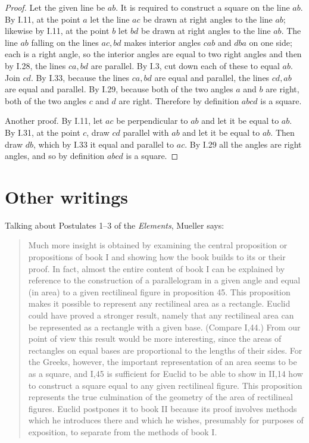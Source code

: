 \documentclass{article}
\begin{document}
\begin{proof}
Let the given line be $ab$.
It is required to construct a square on the line $ab$.
By I.11, at the point $a$ let the line $ac$ be drawn at right angles to the line $ab$; likewise
by I.11, at the point $b$ let $bd$ be drawn at right angles to the line $ab$.
The line $ab$ falling on the lines $ac, bd$ makes interior angles $cab$ and $dba$ on one side; each is a right angle, so the interior angles
are equal to two right angles and then by I.28, the lines $ca,bd$ are parallel.
By I.3, cut down each of these to equal $ab$. 
Join $cd$. By I.33, because the lines $ca,bd$ are equal and parallel, the lines $cd,ab$ are equal and parallel.
By I.29, because both of the two angles $a$ and $b$ are right, both of the two angles $c$ and $d$ are right. Therefore by definition $abcd$
is a square.  

Another proof. By I.11, let $ac$ be perpendicular to $ab$ and let it be equal to $ab$. By I.31, at the point $c$, draw $cd$ parallel
with $ab$ and let it be equal to $ab$. Then draw $db$, which by I.33 it equal and parallel to $ac$.
By I.29 all the angles are right angles, and so by definition $abcd$ is a square.
\end{proof}




\section{Other writings}
Talking about Postulates 1--3 of the {\em Elements}, Mueller \cite[p.~16]{mueller} says:

\begin{quote}
Much more insight is obtained by examining the central proposition or propositions of book I and showing how the
book builds to its or their proof. In fact, almost the entire content of book I can be explained by reference to the construction of a 
parallelogram in a given angle and equal (in area) to a given rectilineal figure in proposition 45. This proposition makes it possible to represent
any rectilineal area as a rectangle. Euclid could have proved a stronger result, namely that any rectilineal area can be represented as a rectangle with a given base.
(Compare I,44.) From our point of view this result would be more interesting, since the areas of rectangles on equal bases are proportional
to the lengths of their sides. For the Greeks, however, the important representation of an area seems to be as a square, and I,45 is sufficient
for Euclid to be able to show in II,14 how to construct a square equal to any given rectilineal figure. This proposition represents
the true culmination of the geometry of the area of rectilineal figures. Euclid postpones it to book II because its proof involves methods which he introduces there and which he wishes, presumably for purposes of exposition, to separate from the methods of book I.
\end{quote}
\end{document}
